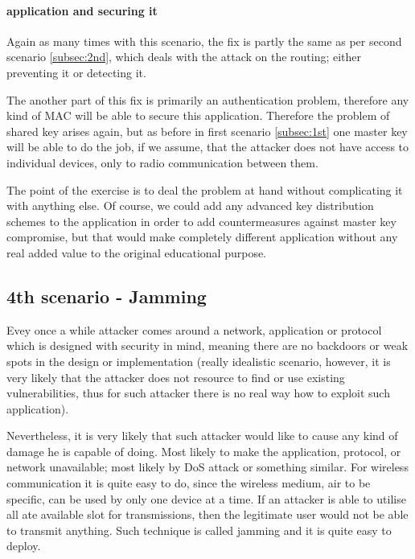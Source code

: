 \documentclass[
  print, %
  Table,   %
  nolof,     %
  nolot,     %
           oneside
]{fithesis3}
\begin{document}
    \paragraph{application and securing it}
    Again as many times with this scenario, the fix is partly the same as per second scenario \ref{subsec:2nd}, which deals with the attack on the routing; either preventing it or detecting it.

    The another part of this fix is primarily an authentication problem, therefore any kind of MAC will be able to secure this application. Therefore the problem of shared key arises again, but as before in first scenario \ref{subsec:1st} one master key will be able to do the job, if we assume, that the attacker does not have access to individual devices, only to radio communication between them.

    The point of the exercise is to deal the problem at hand without complicating it with anything else. Of course, we could add any advanced key distribution schemes  %
    to the application in order to add countermeasures against master key compromise, but that would make completely different application without any real added value to the original educational purpose.

    \subsection{4th scenario - Jamming} \label{subsec:4th}
    Evey once a while attacker comes around a network, application or protocol which is designed with security in mind, meaning there are no backdoors or weak spots in the design or implementation (really idealistic scenario, however, it is very likely that the attacker does not resource to find or use existing vulnerabilities, thus for such attacker there is no real way how to exploit such application).

    Nevertheless, it is very likely that such attacker would like to cause any kind of damage he is capable of doing. Most likely to make the application, protocol, or network unavailable; most likely by DoS attack %
    or something similar. For wireless communication it is quite easy to do, since the wireless medium, air to be specific, can be used by only one device at a time. If an attacker is able to utilise all ate available slot for transmissions, then the legitimate user would not be able to transmit anything. Such technique is called jamming and it is quite easy to deploy.
\end{document}
